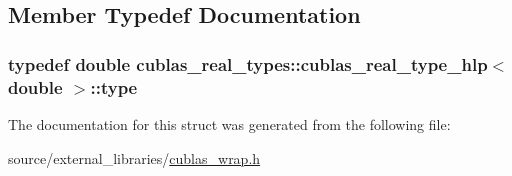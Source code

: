 \subsection{Member Typedef Documentation}
\hypertarget{structcublas__real__types_1_1cublas__real__type__hlp_3_01double_01_4_ac11479e7b81a80ff99ba21fad166d819}{
\subsubsection[{type}]{\setlength{\rightskip}{0pt plus 5cm}typedef double {\bf cublas\-\_\-real\-\_\-types\-::cublas\-\_\-real\-\_\-type\-\_\-hlp}$<$ double $>$\-::{\bf type}}}\label{structcublas__real__types_1_1cublas__real__type__hlp_3_01double_01_4_ac11479e7b81a80ff99ba21fad166d819}


The documentation for this struct was generated from the following file\-:\begin{DoxyCompactItemize}
\item 
source/external\-\_\-libraries/\hyperlink{cublas__wrap_8h}{cublas\-\_\-wrap.\-h}\end{DoxyCompactItemize}
